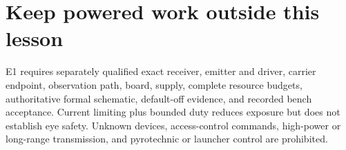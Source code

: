 \documentclass[10pt]{article}
\begin{document}
\section{Keep powered work outside this lesson}
E1 requires separately qualified exact receiver, emitter and driver, carrier
endpoint, observation path, board, supply, complete resource budgets,
authoritative formal schematic, default-off evidence, and recorded bench
acceptance. Current limiting plus bounded duty reduces exposure but does not
establish eye safety. Unknown devices, access-control commands, high-power or
long-range transmission, and pyrotechnic or launcher control are prohibited.
\end{document}
